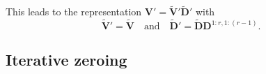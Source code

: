 \documentclass[11pt,a4paper]{article}
\theoremstyle{break}
\numberwithin{dummy}{section}
\theoremstyle{plain}
\theoremstyle{plain}
\theoremstyle{plain}
\theoremstyle{plain}
\theoremstyle{plain}
\theoremstyle{MyNonumberplain}
\newcommand{\0}{\M{0}}
\newcommand{\M}[1]{\mathbf{#1}}
\newcommand{\Mt}[1]{\tilde{\M{#1}}}
\newcommand{\delcol}[2]{\M{#1} \varominus {\mathrm{col}}({#2})}
\begin{document}
\begin{enumerate}[font=\upshape,label=(\roman*),wide,align=right]
This leads to the representation
\begin{math}
  \M{V}' =  \Mt{V}' \Mt{D}'
\end{math}
with
\begin{displaymath}
  \Mt{V}' =  \Mt{V}
  \quad
  \text{and}
  \quad
  \Mt{D}' =
  \Mt{D} \M{D}^{1:r, 1:(r-1)}.
\end{displaymath}
\end{enumerate}


\subsection{Iterative zeroing}
\label{sec:iterative-zeroing}
\end{document}
